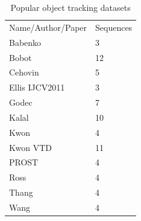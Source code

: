 \begin{table}[h!]
\centering
\begin{tabular}{|ll|}
\hline
Name/Author/Paper & Sequences \\
Babenko           & 3         \\
Bobot             & 12        \\
Cehovin           & 5         \\
Ellis IJCV2011    & 3         \\
Godec             & 7         \\
Kalal             & 10        \\
Kwon              & 4         \\
Kwon VTD          & 11        \\
PROST             & 4         \\
Ross              & 4         \\
Thang             & 4         \\
Wang              & 4         \\
\hline
\end{tabular}
\caption{Popular object tracking datasets}
\label{table:datasets}
\end{table}